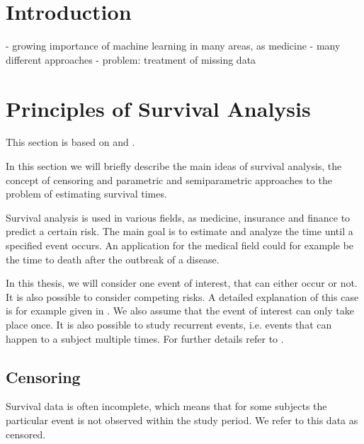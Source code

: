 \documentclass[12pt, a4paper]{article}
\theoremstyle{definition}
\theoremstyle{plain}
\numberwithin{equation}{section}
\numberwithin{figure}{section}
\numberwithin{table}{section}
\begin{document}
	
	\thispagestyle{plain}
	\tableofcontents
	\newpage

	
	\section{Introduction} \label{introduction}
	- growing importance of machine learning in many areas, as medicine
	- many different approaches
	- problem: treatment of missing data
	
	\newpage
	
	\section{Principles of Survival Analysis}
	This section is based on \citet*{sabook} and \citet*{mathsabook}.
	
	In this section we will briefly describe the main ideas of survival analysis, the concept of censoring and parametric and semiparametric approaches to the problem of estimating survival times.
	
	Survival analysis is used in various fields, as medicine, insurance and finance to predict a certain risk.
	The main goal is to estimate and analyze the time until a specified event occurs.
	An application for the medical field could for example be the time to death after the outbreak of a disease.
	
	
	In this thesis, we will consider one event of interest, that can either occur or not.
	It is also possible to consider competing risks.
	A detailed explanation of this case is for example given in \citet*[chapter~8]{bookfailuretime}.
	We also assume that the event of interest can only take place once.
	It is also possible to study recurrent events, i.e. events that can happen to a subject multiple times.
	For further details refer to \citet*[chapter~9]{bookfailuretime}.
	
	\subsection{Censoring} \label{censoring}
	
	
	Survival data is often incomplete, which means that for some subjects the particular event is not observed within the study period. 
	We refer to this data as censored.
	
\end{document}
